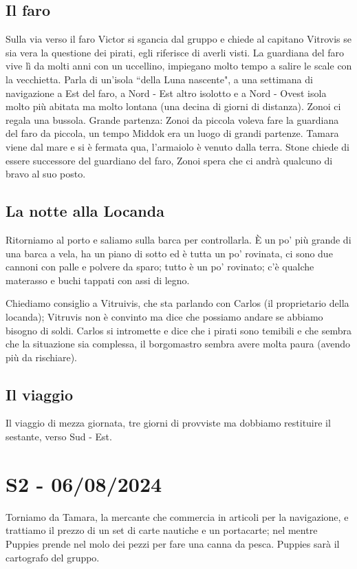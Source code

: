 \documentclass[letterpaper,twocolumn,openany,justified, nodeprecatedcode, nomultitoc]{dndbook}
\begin{document}
\subsection{Il faro} Sulla via verso il faro Victor si sgancia dal gruppo e chiede al capitano Vitrovis se sia vera la questione dei pirati, egli riferisce di averli visti. La guardiana del faro vive lì da molti anni con un uccellino, impiegano molto tempo a salire le scale con la vecchietta. Parla di un'isola ``della Luna nascente", a una settimana di navigazione a Est del faro, a Nord - Est altro isolotto e a Nord - Ovest isola molto più abitata ma molto lontana (una decina di giorni di distanza). Zonoi ci regala una bussola. Grande partenza: Zonoi da piccola voleva fare la guardiana del faro da piccola, un tempo Middok era un luogo di grandi partenze. Tamara viene dal mare e si è fermata qua, l'armaiolo è venuto dalla terra. Stone chiede di essere successore del guardiano del faro, Zonoi spera che ci andrà qualcuno di bravo al suo posto.

\subsection{La notte alla Locanda}
Ritorniamo al porto e saliamo sulla barca per controllarla. È un po' più grande di una barca a vela, ha un piano di sotto ed è tutta un po' rovinata, ci sono due cannoni con palle e polvere da sparo; tutto è un po' rovinato; c'è qualche materasso e buchi tappati con assi di legno.

Chiediamo consiglio a Vitruivis, che sta parlando con Carlos (il proprietario della locanda); Vitruvis non è convinto ma dice che possiamo andare se abbiamo bisogno di soldi. Carlos si intromette e dice che i pirati sono temibili e che sembra che la situazione sia complessa, il borgomastro sembra avere molta paura (avendo più da rischiare).

\subsection{Il viaggio}
Il viaggio di mezza giornata, tre giorni di provviste ma dobbiamo restituire il sestante, verso Sud - Est.





\section{S2 - 06/08/2024}
Torniamo da Tamara, la mercante che commercia in articoli per la navigazione, e trattiamo il prezzo di un set di carte nautiche e un portacarte; nel mentre Puppies prende nel molo dei pezzi per fare una canna da pesca. Puppies sarà il cartografo del gruppo.
\end{document}
